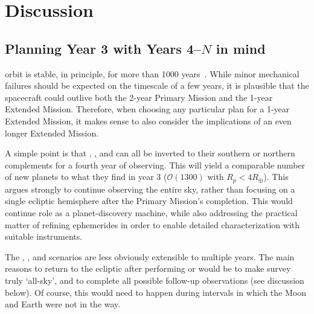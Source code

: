 \section{Discussion} 
\label{sec:discussion}

\subsection{Planning Year 3 with Years 4--$N$ in mind}
\label{sec:gtr_1yr_horizon}

\tesss orbit is stable, in principle, for more than 1000 years~\citep{gangestad_high_2013}.
While minor mechanical failures should be expected on the timescale of a few years, it is plausible that the spacecraft could outlive both the 2-year Primary Mission and the 1-year Extended Mission.
Therefore, when choosing any particular plan for a 1-year Extended Mission, it makes
sense to also consider the implications of an even longer Extended Mission.

A simple point is that \nhemi, \npole, and \shemiAvoid\:can all be inverted to their southern or northern complements for a fourth year of observing.
This will yield a comparable number of new planets to what they find in year 3 ($\mathcal{O}(1300)$ with $R_p<4R_\oplus$).
This argues strongly to continue observing the entire sky, rather than focusing on a single ecliptic hemisphere after the Primary Mission's completion.
This would continue \tesss role as a planet-discovery machine, while also addressing the practical matter of refining ephemerides in order to enable detailed characterization with suitable instruments.

The \elong, \eshort, and \hemis\:scenarios are less obviously extensible to multiple years.
The main reasons to return to the ecliptic after performing \elong\:or \eshort\:would be to make \tesss survey truly `all-sky', and to complete all possible \ktwo follow-up observations (see discussion below).
Of course, this would need to happen during intervals in which the Moon and Earth were not in the way.

